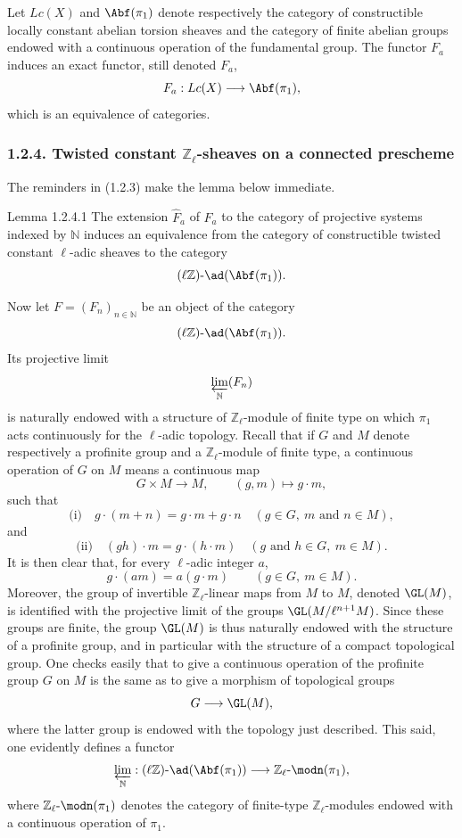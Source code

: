 Let \(Lc(X)\) and \(\Abf(\pi_1)\) denote respectively the category of constructible locally constant abelian torsion sheaves and the category of finite abelian groups endowed with a continuous operation of the fundamental group. The functor \(F_a\) induces an exact functor, still denoted \(F_a\),
\[
F_a:Lc(X)\longrightarrow \Abf(\pi_1),
\]
which is an equivalence of categories.

\subsubsection*{1.2.4. Twisted constant \(\mathbb Z_\ell\)-sheaves on a connected prescheme}

The reminders in (1.2.3) make the lemma below immediate.

\begin{statement}{Lemma 1.2.4.1}
The extension \(\widehat F_a\) of \(F_a\) to the category of projective systems indexed by \(\mathbb N\) induces an equivalence from the category of constructible twisted constant \(\ell\)-adic sheaves to the category
\[
(\ell\mathbb Z)\text{-}\ad(\Abf(\pi_1)).
\]
\end{statement}

Now let \(F=(F_n)_{n\in\mathbb N}\) be an object of the category
\[
(\ell\mathbb Z)\text{-}\ad(\Abf(\pi_1)).
\]
Its projective limit
\[
\varprojlim_{\mathbb N}(F_n)
\]
is naturally endowed with a structure of \(\mathbb Z_\ell\)-module of finite type on which \(\pi_1\) acts continuously for the \(\ell\)-adic topology. Recall that if \(G\) and \(M\) denote respectively a profinite group and a \(\mathbb Z_\ell\)-module of finite type, a continuous operation of \(G\) on \(M\) means a continuous map
\[
G\times M\longrightarrow M,\qquad (g,m)\longmapsto g\cdot m,
\]
such that
\[
\text{(i)}\quad g\cdot(m+n)=g\cdot m+g\cdot n\quad (g\in G,\ m\text{ and }n\in M),
\]
and
\[
\text{(ii)}\quad (gh)\cdot m=g\cdot(h\cdot m)\quad (g\text{ and }h\in G,\ m\in M).
\]
It is then clear that, for every \(\ell\)-adic integer \(a\),
\[
g\cdot(am)=a(g\cdot m)\qquad (g\in G,\ m\in M).
\]
Moreover, the group of invertible \(\mathbb Z_\ell\)-linear maps from \(M\) to \(M\), denoted \(\GL(M)\), is identified with the projective limit of the groups \(\GL(M/\ell^{n+1}M)\). Since these groups are finite, the group \(\GL(M)\) is thus naturally endowed with the structure of a profinite group, and in particular with the structure of a compact topological group. One checks easily that to give a continuous operation of the profinite group \(G\) on \(M\) is the same as to give a morphism of topological groups
\[
G\longrightarrow \GL(M),
\]
where the latter group is endowed with the topology just described. This said, one evidently defines a functor
\[
\varprojlim_{\mathbb N}:(\ell\mathbb Z)\text{-}\ad(\Abf(\pi_1))\longrightarrow
\mathbb Z_\ell\text{-}\modn(\pi_1),
\]
where \(\mathbb Z_\ell\text{-}\modn(\pi_1)\) denotes the category of finite-type \(\mathbb Z_\ell\)-modules endowed with a continuous operation of \(\pi_1\).

